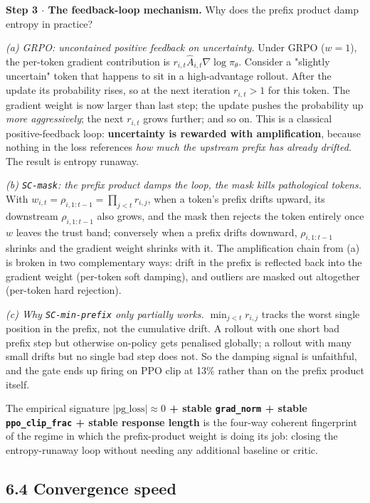 \documentclass[11pt,a4paper]{article}
\theoremstyle{remark}
\begin{document}
\textbf{Step 3 $\cdot$ The feedback-loop mechanism.} Why does the prefix product damp entropy in practice?

\emph{(a) GRPO: uncontained positive feedback on uncertainty.} Under GRPO ($w=1$), the per-token gradient contribution is $r_{i,t}\hat A_{i,t}\nabla\log\pi_\theta$. Consider a "slightly uncertain" token that happens to sit in a high-advantage rollout. After the update its probability rises, so at the next iteration $r_{i,t}>1$ for this token. The gradient weight is now larger than last step; the update pushes the probability up \emph{more aggressively}; the next $r_{i,t}$ grows further; and so on. This is a classical positive-feedback loop: \textbf{uncertainty is rewarded with amplification}, because nothing in the loss references \emph{how much the upstream prefix has already drifted}. The result is entropy runaway.

\emph{(b) \texttt{SC-mask}: the prefix product damps the loop, the mask kills pathological tokens.} With $w_{i,t} = \rho_{i,1:t-1} = \prod_{j<t} r_{i,j}$, when a token's prefix drifts upward, its downstream $\rho_{i,1:t-1}$ also grows, and the mask then rejects the token entirely once $w$ leaves the trust band; conversely when a prefix drifts downward, $\rho_{i,1:t-1}$ shrinks and the gradient weight shrinks with it. The amplification chain from (a) is broken in two complementary ways: drift in the prefix is reflected back into the gradient weight (per-token soft damping), and outliers are masked out altogether (per-token hard rejection).

\emph{(c) Why \texttt{SC-min-prefix} only partially works.} $\min_{j<t}r_{i,j}$ tracks the worst single position in the prefix, not the cumulative drift. A rollout with one short bad prefix step but otherwise on-policy gets penalised globally; a rollout with many small drifts but no single bad step does not. So the damping signal is unfaithful, and the gate ends up firing on PPO clip at 13\% rather than on the prefix product itself.

The empirical signature \textbf{$|\text{pg\_loss}|\approx 0$ + stable \texttt{grad\_norm} + stable \texttt{ppo\_clip\_frac} + stable response length} is the four-way coherent fingerprint of the regime in which the prefix-product weight is doing its job: closing the entropy-runaway loop without needing any additional baseline or critic.

\subsection*{6.4 Convergence speed}
\end{document}
